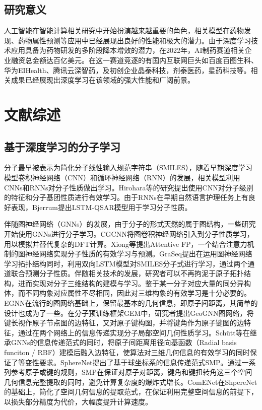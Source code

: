 \subsection{研究意义}
人工智能在智能计算相关研究中开始扮演越来越重要的角色，相关模型在药物发现、药物属性预测等应用中已经展现出良好的性能和极大的潜力。由于深度学习技术应用具备为药物研发的多阶段降本增效的潜力，在2022年，AI制药赛道相关企业融资总金额达百亿美元。在这一赛道竞逐的有国内互联网巨头如百度百图生科、华为EIHealth、腾讯云深智药，及初创企业晶泰科技，剂泰医药，星药科技等。相关成果已经展现出深度学习在该领域的强大性能和广阔前景。

\section{文献综述}
\subsection{基于深度学习的分子学习}
分子最早被表示为简化分子线性输入规范字符串（SMILES）\cite{smiles_weinberger_88}，随着早期深度学习模型卷积神经网络（CNN）和循环神经网络（RNN）的发展，相关模型利用CNNs和RNNs对分子性质做出学习。Hirohara等\cite{cnnsmiles_hirohara_18}的研究提出使用CNN对分子级别的特征和分子基团性质进行有效学习。由于RNNs在早期自然语言护理任务上有良好表现，Bjerrum\cite{rnnsmiles_bjerrum_17}提出LSTM-QSAR模型用于学习分子性质。

伴随图神经网络（GNNs）的发展，由于分子的形式天然的属于图结构，一些研究开始使用GNNs进行分子学习。CGCNN\cite{cgcnn_xie_18}将图卷积神经网络引入到分子性质学习，用以模拟并替代复杂的DFT计算。Xiong等\cite{attentivefp_xiong_20}提出Attentive FP，一个结合注意力机制的图神经网络实现分子性质的有效学习与预测。GraSeq\cite{graseq_guo_20}提出在运用图神经网络学习拓扑结构同时，利用双向LSTM模型对SMILES分子式进行学习，通过两个通道联合预测分子性质。伴随相关技术的发展，研究者可以不再拘泥于原子拓扑结构，进而实现对分子三维结构的建模与学习。鉴于某一分子对应大量的同分异构体，而不同构象对应属性不尽相同，因此对三维构象的有效学习是十分必要的。EGNN\cite{egnn_satorras_21}在流行的图网络基础上，保留最基本的几何信息，即原子间距离，其简单的设计也成为了一些。在分子预训练框架GEM\cite{gem_fang_22}中，研究者提出GeoGNN图网络，将键长视作原子节点图的边特征，又对原子键构图，并将键角作为原子键图的边特征，通过在两个网络上的信息传递实现分子局部空间几何性质学习。Sch\"{u}tt等\cite{schnet_schutt_17}在继承GNNs的信息传递范式的同时，将原子间距离用径向基函数（Radial basis funciton / RBF）建模后融入边特征，使算法对三维几何信息的有效学习的同时保证了等变性要求。SphereNet\cite{spherenet_liu_22}提出了基于球坐标系的信息传递范式SMP。通过一系列参考原子或键的规则，SMP在保证对原子对距离，键角和键扭转角这三个空间几何信息完整提取的同时，避免计算复杂度的爆炸式增长。ComENet\cite{comenet_wang_22}在ShpereNet的基础上，简化了空间几何信息的提取范式，在保证利用完整空间信息的前提下，以损失部分精度为代价，大幅度提升计算速度。

